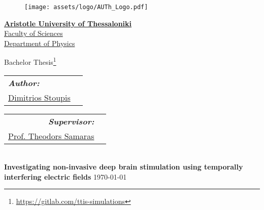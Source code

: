 \begin{titlepage}
\begin{figure}[H]
    \centering
    \texttt{[image: assets/logo/AUTh\_Logo.pdf]}
    \label{fig:cover_auth_logo}
\end{figure}

\centering
\Large \href{https://www.auth.gr/}{\textbf{Aristotle University of Thessaloniki}}\\
\large \href{http://www.sci.auth.gr/}{Faculty of Sciences}\\
\large \href{https://www.physics.auth.gr/}{Department of Physics}

\vspace{18pt}

\large Bachelor Thesis\footnote{\href{https://gitlab.com/ttis-simulations}{https://gitlab.com/ttis-simulations}}
\vspace{12pt}

\begin{minipage}[t]{0.5\textwidth}
    \raggedright
    \begin{tabular}{ll}
        \textit{\textbf{Author:}} & \\
        \href{https://gitlab.com/dimst23}{Dimitrios Stoupis}\footnotemark[2] & \\
    \end{tabular}
\end{minipage}
\begin{minipage}[t]{0.49\textwidth}
    \raggedleft
    \begin{tabular}{rr}
        \textit{\textbf{Supervisor:}} & \\
        \href{http://users.auth.gr/theosama/}{Prof. Theodors Samaras}\footnotemark[3] & \\
    \end{tabular}
\end{minipage}


\noindent\makebox[\linewidth]{\rule{\textwidth}{0.5pt}}\\[0.2cm]
\LARGE{\textbf{Investigating non-invasive deep brain stimulation using
temporally interfering electric fields}}
\noindent\makebox[\linewidth]{\rule{\textwidth}{0.5pt}}\vspace{0.2cm}
\vspace{8pt}
\large\today


\end{titlepage}
